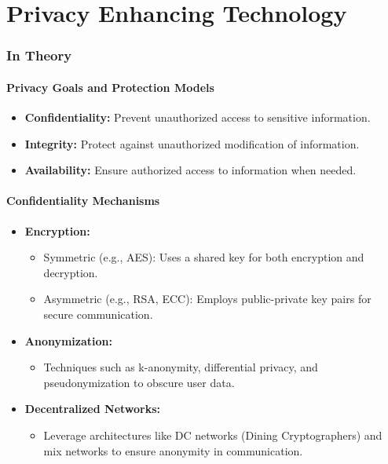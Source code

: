 \documentclass{article}
\author{Leopold Lemmermann}
\begin{document}
\createtitle


\part{Privacy Enhancing Technology}
\section{In Theory}

\subsection{Privacy Goals and Protection Models}
\begin{itemize}
    \item \textbf{Confidentiality:} Prevent unauthorized access to sensitive information.
    \item \textbf{Integrity:} Protect against unauthorized modification of information.
    \item \textbf{Availability:} Ensure authorized access to information when needed.
\end{itemize}

\subsection{Confidentiality Mechanisms}
\begin{itemize}
    \item \textbf{Encryption:}
    \begin{itemize}
        \item Symmetric (e.g., AES): Uses a shared key for both encryption and decryption.
        \item Asymmetric (e.g., RSA, ECC): Employs public-private key pairs for secure communication.
    \end{itemize}
    \item \textbf{Anonymization:}
    \begin{itemize}
        \item Techniques such as k-anonymity, differential privacy, and pseudonymization to obscure user data.
    \end{itemize}
    \item \textbf{Decentralized Networks:}
    \begin{itemize}
        \item Leverage architectures like DC networks (Dining Cryptographers) and mix networks to ensure anonymity in communication.
    \end{itemize}
\end{itemize}
\end{document}

